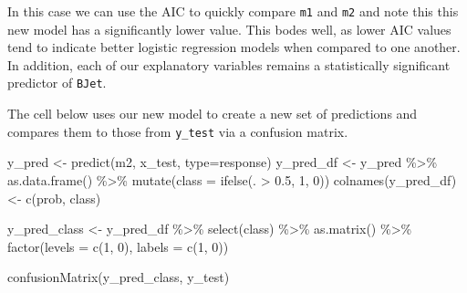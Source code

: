 \documentclass[
]{article}
\newenvironment{Shaded}{\begin{snugshade}}{\end{snugshade}}
\newcommand{\AttributeTok}[1]{\textcolor[rgb]{0.77,0.63,0.00}{#1}}
\newcommand{\DecValTok}[1]{\textcolor[rgb]{0.00,0.00,0.81}{#1}}
\newcommand{\FloatTok}[1]{\textcolor[rgb]{0.00,0.00,0.81}{#1}}
\newcommand{\FunctionTok}[1]{\textcolor[rgb]{0.00,0.00,0.00}{#1}}
\newcommand{\NormalTok}[1]{#1}
\newcommand{\OtherTok}[1]{\textcolor[rgb]{0.56,0.35,0.01}{#1}}
\newcommand{\SpecialCharTok}[1]{\textcolor[rgb]{0.00,0.00,0.00}{#1}}
\newcommand{\StringTok}[1]{\textcolor[rgb]{0.31,0.60,0.02}{#1}}
\begin{document}
In this case we can use the AIC to quickly compare \texttt{m1} and
\texttt{m2} and note this this new model has a significantly lower
value. This bodes well, as lower AIC values tend to indicate better
logistic regression models when compared to one another. In addition,
each of our explanatory variables remains a statistically significant
predictor of \texttt{BJet}.

The cell below uses our new model to create a new set of predictions and
compares them to those from \texttt{y\_test} via a confusion matrix.

\begin{Shaded}
\begin{Highlighting}[]
\NormalTok{y\_pred }\OtherTok{\textless{}{-}} \FunctionTok{predict}\NormalTok{(m2, x\_test, }\AttributeTok{type=}\StringTok{\textquotesingle{}response\textquotesingle{}}\NormalTok{) }
\NormalTok{y\_pred\_df }\OtherTok{\textless{}{-}}\NormalTok{ y\_pred }\SpecialCharTok{\%\textgreater{}\%}
    \FunctionTok{as.data.frame}\NormalTok{() }\SpecialCharTok{\%\textgreater{}\%}
      \FunctionTok{mutate}\NormalTok{(}\AttributeTok{class =} \FunctionTok{ifelse}\NormalTok{(. }\SpecialCharTok{\textgreater{}} \FloatTok{0.5}\NormalTok{, }\DecValTok{1}\NormalTok{, }\DecValTok{0}\NormalTok{))}
\FunctionTok{colnames}\NormalTok{(y\_pred\_df) }\OtherTok{\textless{}{-}} \FunctionTok{c}\NormalTok{(}\StringTok{\textquotesingle{}prob\textquotesingle{}}\NormalTok{, }\StringTok{\textquotesingle{}class\textquotesingle{}}\NormalTok{)}

\NormalTok{y\_pred\_class }\OtherTok{\textless{}{-}}\NormalTok{ y\_pred\_df }\SpecialCharTok{\%\textgreater{}\%}
  \FunctionTok{select}\NormalTok{(class) }\SpecialCharTok{\%\textgreater{}\%} \FunctionTok{as.matrix}\NormalTok{() }\SpecialCharTok{\%\textgreater{}\%}
    \FunctionTok{factor}\NormalTok{(}\AttributeTok{levels =} \FunctionTok{c}\NormalTok{(}\DecValTok{1}\NormalTok{, }\DecValTok{0}\NormalTok{), }\AttributeTok{labels =} \FunctionTok{c}\NormalTok{(}\DecValTok{1}\NormalTok{, }\DecValTok{0}\NormalTok{))}

\FunctionTok{confusionMatrix}\NormalTok{(y\_pred\_class, y\_test)}
\end{Highlighting}
\end{Shaded}
\end{document}
